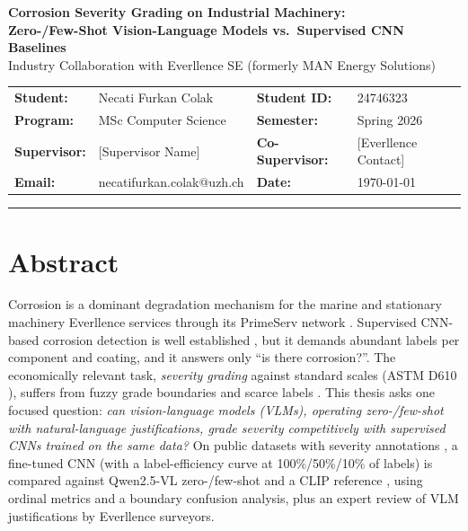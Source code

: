 \documentclass[10pt,a4paper]{article}
\begin{document}
\begin{center}
    {\large \textbf{Corrosion Severity Grading on Industrial Machinery:\\[0.1em]Zero-/Few-Shot Vision-Language Models vs.\ Supervised CNN Baselines}}\\[0.2em]
    {\small Industry Collaboration with Everllence SE (formerly MAN Energy Solutions)}
\end{center}

\vspace{0.2em}

\noindent
{\small
\begin{tabularx}{\textwidth}{>{\bfseries}l X >{\bfseries}l X}
Student: & Necati Furkan Colak & Student ID: & 24746323 \\
Program: & MSc Computer Science & Semester: & Spring 2026 \\
Supervisor: & [Supervisor Name] & Co-Supervisor: & [Everllence Contact] \\
Email: & necatifurkan.colak@uzh.ch & Date: & \today \\
\end{tabularx}}

\vspace{0.3em}
\hrule
\vspace{0.3em}

\section{Abstract}

Corrosion is a dominant degradation mechanism for the marine and stationary machinery Everllence services through its PrimeServ network \cite{everllence2025}. Supervised CNN-based corrosion detection is well established \cite{atha2018, shiptech2024}, but it demands abundant labels per component and coating, and it answers only ``is there corrosion?''. The economically relevant task, \emph{severity grading} against standard scales (ASTM D610 \cite{astmd610}), suffers from fuzzy grade boundaries and scarce labels \cite{rios2025astm}. This thesis asks one focused question: \emph{can vision-language models (VLMs), operating zero-/few-shot with natural-language justifications, grade severity competitively with supervised CNNs trained on the same data?} On public datasets with severity annotations \cite{ameli2023bridge, chliveros2021mavecodd}, a fine-tuned CNN (with a label-efficiency curve at 100\%/50\%/10\% of labels) is compared against Qwen2.5-VL \cite{bai2025qwen25vl} zero-/few-shot and a CLIP reference \cite{radford2021clip}, using ordinal metrics and a boundary confusion analysis, plus an expert review of VLM justifications by Everllence surveyors.
\end{document}
